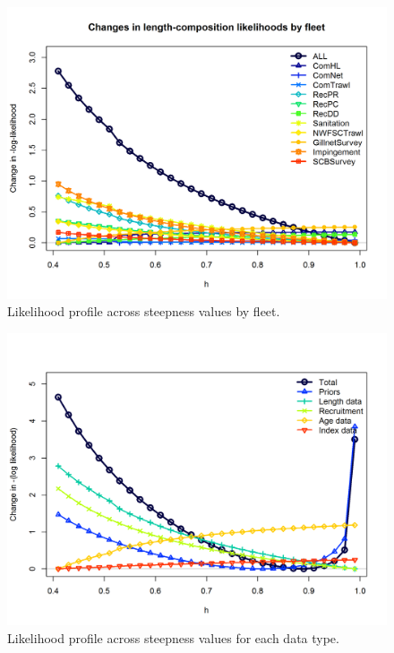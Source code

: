 \documentclass[12pt,]{article}
\begin{document}
\begin{figure}[htbp]
\centering
\includegraphics{Figures/profile_h_piner.png}
\caption{Likelihood profile across steepness values by fleet.
\label{fig:profile_h_piner}}
\end{figure}

\begin{figure}[htbp]
\centering
\includegraphics{Figures/profile_h_like.png}
\caption{Likelihood profile across steepness values for each data type.
\label{fig:profile_h_like}}
\end{figure}
\end{document}
